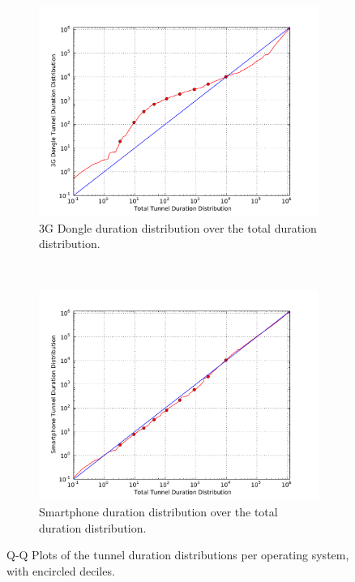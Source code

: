 \begin{figure}
        \begin{subfigure}[b]{0.50\textwidth}
                        \centering
                \includegraphics[width=\textwidth]{images/qq-total-vs-dongle.pdf}
                \caption{3G Dongle duration distribution over the total duration distribution.}
                \label{fig:qq-total-vs-dongle}
        \end{subfigure}%
        ~
        \begin{subfigure}[b]{0.50\textwidth}
                        \centering
                \includegraphics[width=\textwidth]{images/qq-total-vs-smartphone.pdf}
                \caption{Smartphone duration distribution over the total duration distribution.}
                \label{fig:qq-total-vs-smartphones}
        \end{subfigure}
 \caption{Q-Q Plots of the tunnel duration distributions per operating system, with encircled deciles.}
\label{fig:qq-plots}
\end{figure}

